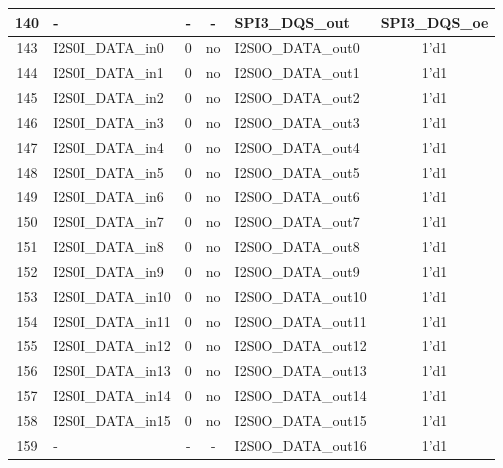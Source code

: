 \begin{longtable}[c]{|c|l|c|c|l|c|}
140  &                        -  &  -  &    -  &          SPI3\_DQS\_out  &      SPI3\_DQS\_oe  \\\hline
143  &         I2S0I\_DATA\_in0  &  0  &   no  &       I2S0O\_DATA\_out0  &               1'd1  \\\hline
144  &         I2S0I\_DATA\_in1  &  0  &   no  &       I2S0O\_DATA\_out1  &               1'd1  \\\hline
145  &         I2S0I\_DATA\_in2  &  0  &   no  &       I2S0O\_DATA\_out2  &               1'd1  \\\hline
146  &         I2S0I\_DATA\_in3  &  0  &   no  &       I2S0O\_DATA\_out3  &               1'd1  \\\hline
147  &         I2S0I\_DATA\_in4  &  0  &   no  &       I2S0O\_DATA\_out4  &               1'd1  \\\hline
148  &         I2S0I\_DATA\_in5  &  0  &   no  &       I2S0O\_DATA\_out5  &               1'd1  \\\hline
149  &         I2S0I\_DATA\_in6  &  0  &   no  &       I2S0O\_DATA\_out6  &               1'd1  \\\hline
150  &         I2S0I\_DATA\_in7  &  0  &   no  &       I2S0O\_DATA\_out7  &               1'd1  \\\hline
151  &         I2S0I\_DATA\_in8  &  0  &   no  &       I2S0O\_DATA\_out8  &               1'd1  \\\hline
152  &         I2S0I\_DATA\_in9  &  0  &   no  &       I2S0O\_DATA\_out9  &               1'd1  \\\hline
153  &        I2S0I\_DATA\_in10  &  0  &   no  &      I2S0O\_DATA\_out10  &               1'd1  \\\hline
154  &        I2S0I\_DATA\_in11  &  0  &   no  &      I2S0O\_DATA\_out11  &               1'd1  \\\hline
155  &        I2S0I\_DATA\_in12  &  0  &   no  &      I2S0O\_DATA\_out12  &               1'd1  \\\hline
156  &        I2S0I\_DATA\_in13  &  0  &   no  &      I2S0O\_DATA\_out13  &               1'd1  \\\hline
157  &        I2S0I\_DATA\_in14  &  0  &   no  &      I2S0O\_DATA\_out14  &               1'd1  \\\hline
158  &        I2S0I\_DATA\_in15  &  0  &   no  &      I2S0O\_DATA\_out15  &               1'd1  \\\hline
159  &                        -  &  -  &    -  &      I2S0O\_DATA\_out16  &               1'd1  \\\hline

\end{longtable}
